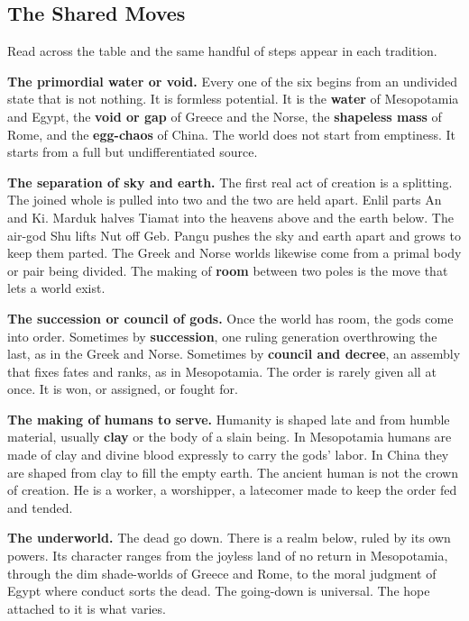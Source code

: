 \subsection{The Shared Moves}

Read across the table and the same handful of steps appear in each tradition.

\textbf{The primordial water or void.} Every one of the six begins from an undivided state that is not nothing. It is formless potential. It is the \textbf{water} of Mesopotamia and Egypt, the \textbf{void or gap} of Greece and the Norse, the \textbf{shapeless mass} of Rome, and the \textbf{egg-chaos} of China. The world does not start from emptiness. It starts from a full but undifferentiated source.

\textbf{The separation of sky and earth.} The first real act of creation is a splitting. The joined whole is pulled into two and the two are held apart. Enlil parts An and Ki. Marduk halves Tiamat into the heavens above and the earth below. The air-god Shu lifts Nut off Geb. Pangu pushes the sky and earth apart and grows to keep them parted. The Greek and Norse worlds likewise come from a primal body or pair being divided. The making of \textbf{room} between two poles is the move that lets a world exist.

\textbf{The succession or council of gods.} Once the world has room, the gods come into order. Sometimes by \textbf{succession}, one ruling generation overthrowing the last, as in the Greek and Norse. Sometimes by \textbf{council and decree}, an assembly that fixes fates and ranks, as in Mesopotamia. The order is rarely given all at once. It is won, or assigned, or fought for.

\textbf{The making of humans to serve.} Humanity is shaped late and from humble material, usually \textbf{clay} or the body of a slain being. In Mesopotamia humans are made of clay and divine blood expressly to carry the gods' labor. In China they are shaped from clay to fill the empty earth. The ancient human is not the crown of creation. He is a worker, a worshipper, a latecomer made to keep the order fed and tended.

\textbf{The underworld.} The dead go down. There is a realm below, ruled by its own powers. Its character ranges from the joyless land of no return in Mesopotamia, through the dim shade-worlds of Greece and Rome, to the moral judgment of Egypt where conduct sorts the dead. The going-down is universal. The hope attached to it is what varies.

